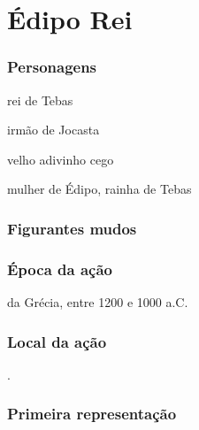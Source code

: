 

\newcommand{\NL}[1]{%
 \marginpar[\raggedleft\footnotesize #1]{\raggedright\footnotesize #1}}

\part{Édipo Rei}
\paginabranca

\section{Personagens}

 rei de Tebas


 irmão de Jocasta


 velho adivinho cego

 mulher de Édipo, rainha de Tebas





\section{Figurantes mudos} 







\section{Época da ação} 

 da Grécia, entre 1200 e 1000 a.C.

\section{Local da ação} 

.

\section{Primeira representação} 

